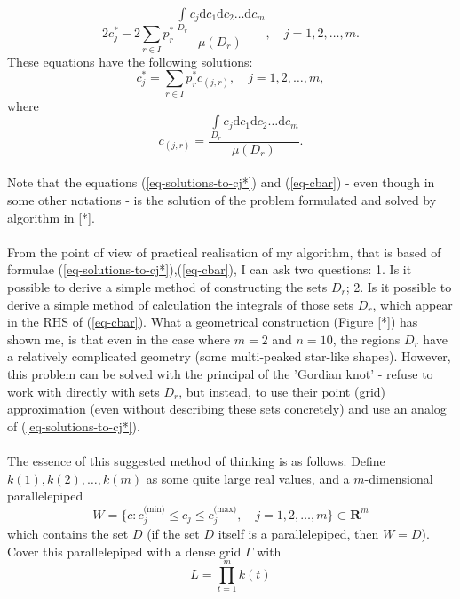 \documentclass[11pt,a4paper]{article}
\numberwithin{equation}{subsection}
\begin{document}
\begin{equation}
2 c_{j}^{*} - 2 \sum\limits_{r \in I} p_{r}^{*}\frac{\int\limits_{D_{r}} c_{j}\mathrm{d}c_{1}\mathrm{d}c_{2}\dots\mathrm{d}c_{m}}{\mu(D_{r})} , \quad j = 1,2,\dots,m.
\end{equation}
These equations have the following solutions:
\begin{equation}
c_{j}^{*} = \sum\limits_{r \in I} p_{r}^{*} \bar{c}_{(j,r)}, \quad j = 1,2,\dots,m, \label{eq-solutions-to-cj*}
\end{equation}
where
\begin{equation}
\bar{c}_{(j,r)} = \frac{\int\limits_{D_{r}} c_{j}\mathrm{d}c_{1}\mathrm{d}c_{2}\dots\mathrm{d}c_{m}}{\mu(D_{r})}. \label{eq-cbar}
\end{equation}
\\
Note that the equations (\ref{eq-solutions-to-cj*}) and (\ref{eq-cbar}) - even though in some other notations - is the solution of the problem formulated and solved by algorithm in [*].\\
\\
From the point of view of practical realisation of my algorithm, that is based of formulae (\ref{eq-solutions-to-cj*}),(\ref{eq-cbar}), I can ask two questions: 1. Is it possible to derive a simple method of constructing the sets $D_{r}$; 2. Is it possible to derive a simple method of calculation the integrals of those sets $D_{r}$, which appear in the RHS of (\ref{eq-cbar}). What a geometrical construction (Figure [*]) has shown me, is that even in the case where $m=2$ and $n=10$, the regions $D_{r}$ have a relatively complicated geometry (some multi-peaked star-like shapes). However, this problem can be solved with the principal of the 'Gordian knot' - refuse to work with directly with sets $D_{r}$, but instead, to use their point (grid) approximation (even without describing these sets concretely) and use an analog of (\ref{eq-solutions-to-cj*}).\\
\\
The essence of this suggested method of thinking is as follows. Define $k(1),k(2),\dots,k(m)$ as some quite large real values, and a $m$-dimensional parallelepiped
\begin{equation}
W=\{ c:c_{j}^{(\text{min)}} \leq c_{j} \leq c_{j}^{(\text{max)}}, \quad j=1,2,\dots,m \}\subset \boldsymbol{R}^{m}
\end{equation}
which contains the set $D$ (if the set $D$ itself is a parallelepiped, then $W=D$). Cover this parallelepiped with a dense grid $\Gamma$ with
\begin{equation}
L = \prod\limits_{t=1}^{m}k(t)
\end{equation}
\end{document}
